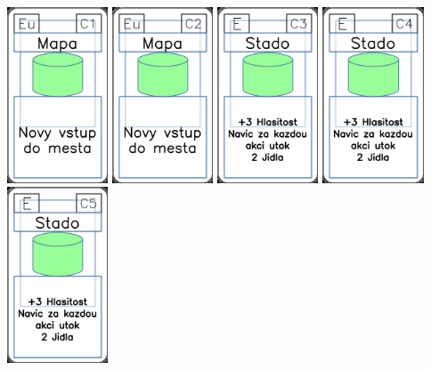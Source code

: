 \documentclass[a4paper]{article}
\begin{document}
	\includegraphics[width=3.0cm]{img-4_40}
	\includegraphics[width=3.0cm]{img-4_41}
	\includegraphics[width=3.0cm]{img-4_42}
	\includegraphics[width=3.0cm]{img-4_43}
	\includegraphics[width=3.0cm]{img-4_44}
\end{document}

